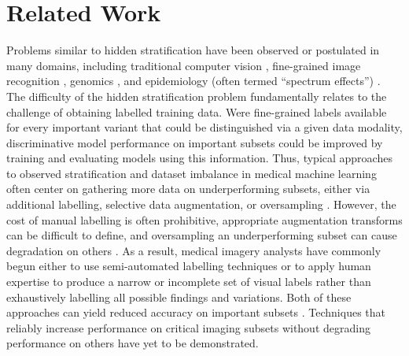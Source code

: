 \documentclass[sigconf]{acmart}
\begin{document}
\section{Related Work}
\label{sec:relwork}

Problems similar to hidden stratification have been observed or postulated in many domains, including traditional computer vision \citep{recht2018cifar}, fine-grained image recognition \citep{yao2011combining}, genomics \citep{cardon2003population}, and epidemiology (often termed ``spectrum effects'') \citep{mulherin2002spectrum}.
The difficulty of the hidden stratification problem fundamentally relates to the challenge of obtaining labelled training data.  
Were fine-grained labels available for every important variant that could be distinguished via a given data modality, discriminative model performance on important subsets could be improved by training and evaluating models using this information.  
Thus, typical approaches to observed stratification and dataset imbalance in medical machine learning often center on gathering more data on underperforming subsets, either via additional labelling, selective data augmentation, or oversampling \citep{Mazurowski2008-cq}.  
However, the cost of manual labelling is often prohibitive, appropriate augmentation transforms can be difficult to define, and oversampling an underperforming subset can cause degradation on others \citep{Fries2019-ze, Ratner2017-td, Buda2018-ab, Zech2018-xq}.  
As a result, medical imagery analysts have commonly begun either to use semi-automated labelling techniques \citep{Wang2017-vm, Fries2019-ze, Irvin2019-ho, Dunnmon2019-zw} or to apply human expertise to produce a narrow or incomplete set of visual labels \citep{Rajpurkar2017-rc} rather than exhaustively labelling all possible findings and variations.
Both of these approaches can yield reduced accuracy on important subsets \citep{Oakden-Rayner2019-yi}.  
Techniques that reliably increase performance on critical imaging subsets without degrading performance on others have yet to be demonstrated.
 
\end{document}
